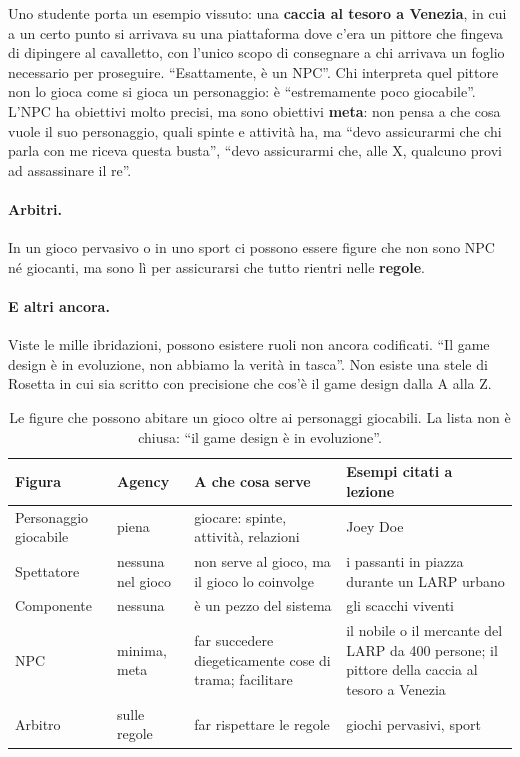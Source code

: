 Uno studente porta un esempio vissuto: una \textbf{caccia al tesoro a Venezia}, in
cui a un certo punto si arrivava su una piattaforma dove c'era un pittore che
fingeva di dipingere al cavalletto, con l'unico scopo di consegnare a chi arrivava
un foglio necessario per proseguire. ``Esattamente, è un NPC''. Chi interpreta
quel pittore non lo gioca come si gioca un personaggio: è ``estremamente poco
giocabile''. L'NPC ha obiettivi molto precisi, ma sono obiettivi \textbf{meta}: non
pensa a che cosa vuole il suo personaggio, quali spinte e attività ha, ma ``devo
assicurarmi che chi parla con me riceva questa busta'', ``devo assicurarmi che, alle
X, qualcuno provi ad assassinare il re''.

\paragraph{Arbitri.} In un gioco pervasivo o in uno sport ci possono essere figure
che non sono NPC né giocanti, ma sono lì per assicurarsi che tutto rientri nelle
\textbf{regole}.

\paragraph{E altri ancora.} Viste le mille ibridazioni, possono esistere ruoli non
ancora codificati. ``Il game design è in evoluzione, non abbiamo la verità in
tasca''. Non esiste una stele di Rosetta in cui sia scritto con precisione che cos'è
il game design dalla A alla Z.

\begin{table}[htbp]
\centering
\small
\begin{tabular}{@{}p{2.3cm}p{2.0cm}p{4.1cm}p{4.6cm}@{}}
\toprule
\textbf{Figura} & \textbf{Agency} & \textbf{A che cosa serve} & \textbf{Esempi
citati a lezione} \\
\midrule
Personaggio giocabile & piena & giocare: spinte, attività, relazioni & Joey Doe \\
Spettatore & nessuna nel gioco & non serve al gioco, ma il gioco lo coinvolge & i
passanti in piazza durante un LARP urbano \\
Componente & nessuna & è un pezzo del sistema & gli scacchi viventi \\
NPC & minima, meta & far succedere diegeticamente cose di trama; facilitare & il
nobile o il mercante del LARP da 400 persone; il pittore della caccia al tesoro a
Venezia \\
Arbitro & sulle regole & far rispettare le regole & giochi pervasivi, sport \\
\bottomrule
\end{tabular}
\caption{Le figure che possono abitare un gioco oltre ai personaggi giocabili. La
lista non è chiusa: ``il game design è in evoluzione''.}
\label{a4:tab:altri}
\end{table}

